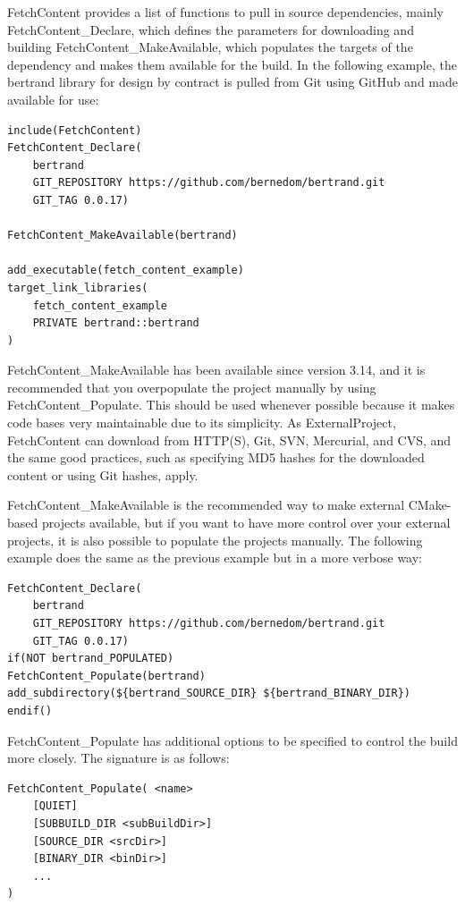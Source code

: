 FetchContent provides a list of functions to pull in source dependencies, mainly FetchContent\_Declare, which defines the parameters for downloading and building FetchContent\_MakeAvailable, which populates the targets of the dependency and makes them available for the build. In the following example, the bertrand library for design by contract is pulled from Git using GitHub and made available for use:

\begin{lstlisting}[style=styleCMake]
include(FetchContent)
FetchContent_Declare(
	bertrand
	GIT_REPOSITORY https://github.com/bernedom/bertrand.git
	GIT_TAG 0.0.17)

FetchContent_MakeAvailable(bertrand)

add_executable(fetch_content_example)
target_link_libraries(
	fetch_content_example
	PRIVATE bertrand::bertrand
)
\end{lstlisting}

FetchContent\_MakeAvailable has been available since version 3.14, and it is recommended that you overpopulate the project manually by using FetchContent\_Populate. This should be used whenever possible because it makes code bases very maintainable due to its simplicity. As ExternalProject, FetchContent can download from HTTP(S), Git, SVN, Mercurial, and CVS, and the same good practices, such as specifying MD5 hashes for the downloaded content or using Git hashes, apply.

FetchContent\_MakeAvailable is the recommended way to make external CMake-based projects available, but if you want to have more control over your external projects, it is also possible to populate the projects manually. The following example does the same as the previous example but in a more verbose way:

\begin{lstlisting}[style=styleCMake]
FetchContent_Declare(
	bertrand
	GIT_REPOSITORY https://github.com/bernedom/bertrand.git
	GIT_TAG 0.0.17)
if(NOT bertrand_POPULATED)
FetchContent_Populate(bertrand)
add_subdirectory(${bertrand_SOURCE_DIR} ${bertrand_BINARY_DIR})
endif()
\end{lstlisting}

FetchContent\_Populate has additional options to be specified to control the build more closely. The signature is as follows:

\begin{lstlisting}[style=styleCMake]
FetchContent_Populate( <name>
	[QUIET]
	[SUBBUILD_DIR <subBuildDir>]
	[SOURCE_DIR <srcDir>]
	[BINARY_DIR <binDir>]
	...
)
\end{lstlisting}

